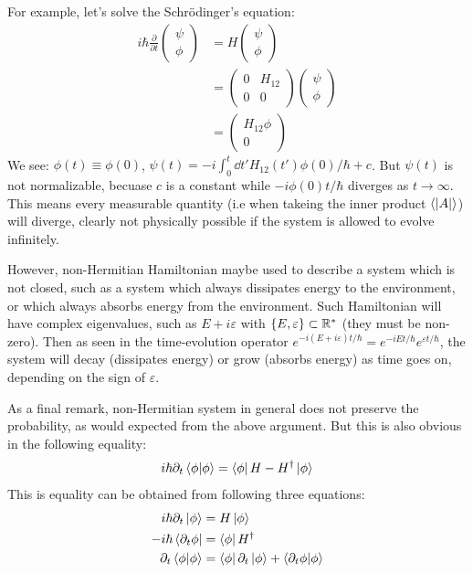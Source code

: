 \documentclass{article}
\begin{document}
For example, let's solve the Schr\"odinger's equation:
\begin{align*}
    i\hbar\frac{\partial }{\partial t}
    \begin{pmatrix}
        \psi \\ \phi
    \end{pmatrix}
    &= H 
    \begin{pmatrix}
        \psi \\ \phi
    \end{pmatrix}
    \\
    &= \begin{pmatrix}
        0 & H_{12} \\ 0 & 0
    \end{pmatrix}
    \begin{pmatrix}
        \psi \\ \phi
    \end{pmatrix}
    \\
    &=
    \begin{pmatrix}
        H_{12}\phi \\ 0
    \end{pmatrix}
\end{align*}
We see: $\phi(t)\equiv\phi(0)$,
$\psi(t)=-i\int_0^t\dd{t'}H_{12}(t')\phi(0)/\hbar + c$.  But $\psi(t)$ is
not normalizable, becuase $c$ is a constant while $-i\phi(0)t/\hbar$
diverges as $t\to\infty$. This means every measurable quantity (i.e
when takeing the inner product $\braket{|A|}$) will diverge, clearly
not physically possible if the system is allowed to evolve infinitely.

However, non-Hermitian Hamiltonian maybe used to describe a system
which is not closed, such as a system which always dissipates energy
to the environment, or which always absorbs energy from the
environment. Such Hamiltonian will have complex eigenvalues, such as
$E+i\varepsilon$ with $\{E,\varepsilon\}\subset\mathbb{R}^*$ (they must be
non-zero).  Then as seen in the time-evolution operator
$e^{-i(E+i\varepsilon)t/\hbar}=e^{-iEt/\hbar}e^{\varepsilon t/\hbar}$,
the system will decay (dissipates energy) or grow (absorbs energy) as
time goes on, depending on the sign of $\varepsilon$.

As a final remark, non-Hermitian system in general does not preserve
the probability, as would expected from the above argument. But this
is also obvious in the following equality:
\begin{equation}
    i\hbar \partial_t \braket{\phi|\phi} 
    = \bra{\phi} H- H^\dagger\ket{\phi}
\end{equation}
This is equality can be obtained from following three equations:
\begin{align*}
    i\hbar\partial_t \ket{\phi} &= H\ket{\phi} \\
    -i\hbar \bra{\partial_t\phi} &= \bra{\phi}H^\dagger \\
    \partial_t \braket{\phi|\phi} &= \bra{\phi}\partial_t\ket{\phi}
    +\braket{\partial_t\phi|\phi}
\end{align*}
\end{document}
